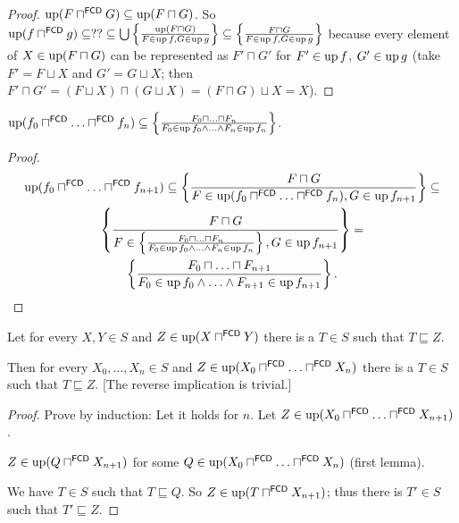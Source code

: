 \begin{proof}
$\operatorname{up} (F \sqcap^{\mathsf{FCD}} G) \subseteq \operatorname{up} (F
\sqcap G)$. So $\operatorname{up} (f \sqcap^{\mathsf{FCD}} g) \subseteq ?? \subseteq \bigcup
\left\{ \frac{ \operatorname{up} (F \sqcap G) }{ F \in \operatorname{up} f,
G \in \operatorname{up} g }\right\} \subseteq \left\{ \frac{ F \sqcap G }{ F \in \operatorname{up} f, G \in \operatorname{up} g }\right\}$ because every
element of $X \in \operatorname{up} (F \sqcap G)$ can be represented as $F' \sqcap G'$
for $F' \in \operatorname{up} f$, $G' \in \operatorname{up} g$ (take $F' = F \sqcup X$ and $G'
= G \sqcup X$; then $F' \sqcap G' = (F \sqcup X) \sqcap (G \sqcup X) = (F
\sqcap G) \sqcup X = X$).
\end{proof}

\begin{cor}
$\operatorname{up} (f_0 \sqcap^{\mathsf{FCD}} \ldots
\sqcap^{\mathsf{FCD}} f_n) \subseteq \left\{ \frac{ F_0 \sqcap \ldots \sqcap
F_n }{ F_0 \in \operatorname{up} f_0 \wedge \ldots \wedge F_n \in \operatorname{up} f_n }\right\}$.
\end{cor}

\begin{proof}
~
\begin{multline*}
\operatorname{up} (f_0 \sqcap^{\mathsf{FCD}} \ldots
\sqcap^{\mathsf{FCD}} f_{n + 1}) \subseteq \left\{ \frac{ F \sqcap G
}{ F \in \operatorname{up} (f_0 \sqcap^{\mathsf{FCD}}
\ldots \sqcap^{\mathsf{FCD}} f_n), G \in \operatorname{up} f_{n + 1} }\right\} \subseteq \\
\left\{ \frac{ F \sqcap G }{ F \in \left\{ \frac{ F_0
\sqcap \ldots \sqcap F_n }{ F_0 \in \operatorname{up} f_0
\wedge \ldots \wedge F_n \in \operatorname{up} f_n }\right\}, G \in \operatorname{up} f_{n + 1} }\right\} = \\
\left\{ \frac{ F_0 \sqcap \ldots \sqcap F_{n + 1} }{
F_0 \in \operatorname{up} f_0 \wedge \ldots \wedge F_{n + 1} \in
\operatorname{up} f_{n + 1} }\right\}.
\end{multline*}
\end{proof}

\begin{lem}
  Let for every $X, Y \in S$ and $Z \in \operatorname{up} (X
  \sqcap^{\mathsf{FCD}} Y)$ there is a $T \in S$ such that $T
  \sqsubseteq Z$.
  
  Then for every $X_0, \ldots, X_n \in S$ and $Z \in \operatorname{up} (X_0
  \sqcap^{\mathsf{FCD}} \ldots \sqcap^{\mathsf{FCD}} X_n)$ there
  is a $T \in S$ such that $T \sqsubseteq Z$. [The reverse implication is
  trivial.]
\end{lem}

\begin{proof}
Prove by induction: Let it holds for $n$. Let $Z \in \operatorname{up} (X_0
\sqcap^{\mathsf{FCD}} \ldots \sqcap^{\mathsf{FCD}} X_{n + 1})$.

$Z \in \operatorname{up} (Q \sqcap^{\mathsf{FCD}} X_{n + 1})$ for some $Q \in
\operatorname{up} (X_0 \sqcap^{\mathsf{FCD}} \ldots
\sqcap^{\mathsf{FCD}} X_n)$ (first lemma).

We have $T \in S$ such that $T \sqsubseteq Q$. So $Z \in \operatorname{up} (T
\sqcap^{\mathsf{FCD}} X_{n + 1})$; thus there is $T' \in S$ such that
$T' \sqsubseteq Z$.
\end{proof}

